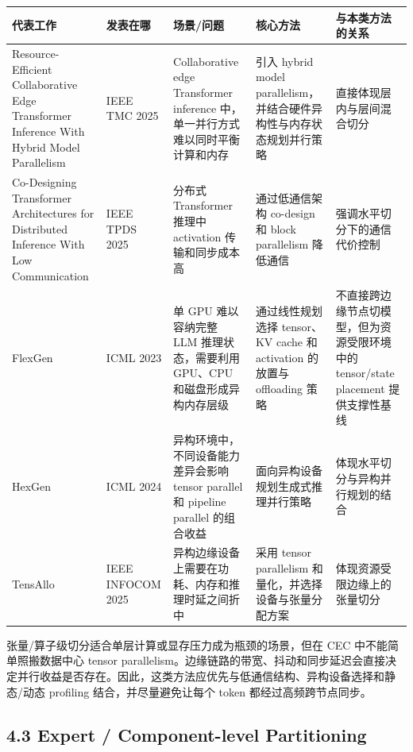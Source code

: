 \documentclass[a4paper,10pt]{ctexart}
\begin{document}
\begin{table}[H]
\centering
\scriptsize
\setlength{\tabcolsep}{3pt}
\renewcommand{\arraystretch}{1.15}
\begin{tabularx}{\textwidth}{|X|X|X|X|X|}
\hline
\textbf{代表工作} & \textbf{发表在哪} & \textbf{场景/问题} & \textbf{核心方法} & \textbf{与本类方法的关系} \\ \hline
Resource-Efficient Collaborative Edge Transformer Inference With Hybrid Model Parallelism & IEEE TMC 2025 & Collaborative edge Transformer inference 中，单一并行方式难以同时平衡计算和内存 & 引入 hybrid model parallelism，并结合硬件异构性与内存状态规划并行策略 & 直接体现层内与层间混合切分 \\ \hline
Co-Designing Transformer Architectures for Distributed Inference With Low Communication & IEEE TPDS 2025 & 分布式 Transformer 推理中 activation 传输和同步成本高 & 通过低通信架构 co-design 和 block parallelism 降低通信 & 强调水平切分下的通信代价控制 \\ \hline
FlexGen & ICML 2023 & 单 GPU 难以容纳完整 LLM 推理状态，需要利用 GPU、CPU 和磁盘形成异构内存层级 & 通过线性规划选择 tensor、KV cache 和 activation 的放置与 offloading 策略 & 不直接跨边缘节点切模型，但为资源受限环境中的 tensor/state placement 提供支撑性基线 \\ \hline
HexGen & ICML 2024 & 异构环境中，不同设备能力差异会影响 tensor parallel 和 pipeline parallel 的组合收益 & 面向异构设备规划生成式推理并行策略 & 体现水平切分与异构并行规划的结合 \\ \hline
TensAllo & IEEE INFOCOM 2025 & 异构边缘设备上需要在功耗、内存和推理时延之间折中 & 采用 tensor parallelism 和量化，并选择设备与张量分配方案 & 体现资源受限边缘上的张量切分 \\ \hline
\end{tabularx}
\end{table}




张量/算子级切分适合单层计算或显存压力成为瓶颈的场景，但在 CEC 中不能简单照搬数据中心 tensor parallelism。边缘链路的带宽、抖动和同步延迟会直接决定并行收益是否存在。因此，这类方法应优先与低通信结构、异构设备选择和静态/动态 profiling 结合，并尽量避免让每个 token 都经过高频跨节点同步。


\subsection*{4.3 Expert / Component-level Partitioning}
\end{document}
